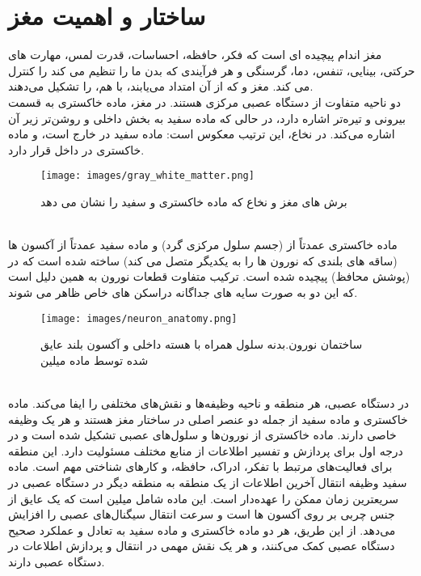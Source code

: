 \section{ساختار و اهمیت مغز}
 مغز اندام پیچیده ای است که فکر، حافظه، احساسات، قدرت لمس، مهارت های حرکتی، بینایی، تنفس، دما، گرسنگی و هر فرآیندی که بدن ما را تنظیم می کند را کنترل می کند. مغز و  که از آن امتداد می‌یابند، با هم،  را تشکیل می‌دهند.
\\
 دو ناحیه متفاوت از دستگاه عصبی مرکزی هستند. در مغز، ماده خاکستری به قسمت بیرونی و تیره‌تر اشاره دارد، در حالی که ماده سفید به بخش داخلی و روشن‌تر زیر آن اشاره می‌کند. در نخاع، این ترتیب معکوس است: ماده سفید در خارج است، و ماده خاکستری در داخل قرار دارد.
\\
\begin{figure}[ht]
\centerline{\texttt{[image: images/gray\_white\_matter.png]}}
\caption[برش های مغز]{برش های مغز و نخاع که ماده خاکستری و سفید را نشان می دهد\cite{brain_anatomy}}
\label{fig:gray-white-matter}
\end{figure}
\\
ماده خاکستری عمدتاً از  (جسم سلول مرکزی گرد) و ماده سفید عمدتاً از آکسون ها (ساقه های بلندی که نورون ها را به یکدیگر متصل می کند) ساخته شده است که در  (پوشش محافظ) پیچیده شده است. ترکیب متفاوت قطعات نورون به همین دلیل است که این دو به صورت سایه های جداگانه دراسکن های خاص ظاهر می شوند.
\\
\begin{figure}[h]
\centerline{\texttt{[image: images/neuron\_anatomy.png]}}
\caption[ساختمان نورون]{ساختمان نورون.بدنه سلول همراه با هسته داخلی و آکسون بلند عایق شده توسط ماده میلین\cite{brain_anatomy}}
\label{fig:neuron-anatomy}
\end{figure}
\\
در دستگاه عصبی، هر منطقه و ناحیه وظیفه‌ها و نقش‌های مختلفی را ایفا می‌کند. ماده خاکستری و ماده سفید از جمله دو عنصر اصلی در ساختار مغز هستند و هر یک وظیفه خاصی دارند. ماده خاکستری از نورون‌ها و سلول‌های عصبی تشکیل شده است و در درجه اول برای پردازش و تفسیر اطلاعات از منابع مختلف مسئولیت دارد. این منطقه برای فعالیت‌های مرتبط با تفکر، ادراک، حافظه، و کارهای شناختی مهم است. ماده سفید وظیفه انتقال آخرین اطلاعات از یک منطقه به منطقه دیگر در دستگاه عصبی در سریعترین زمان ممکن را عهده‌دار است. این ماده شامل میلین است که یک عایق از جنس چربی بر روی آکسون ها است و سرعت انتقال سیگنال‌های عصبی را افزایش می‌دهد. از این طریق، هر دو ماده خاکستری و ماده سفید به تعادل و عملکرد صحیح دستگاه عصبی کمک می‌کنند، و هر یک نقش مهمی در انتقال و پردازش اطلاعات در دستگاه عصبی دارند\cite{brain_anatomy}.
